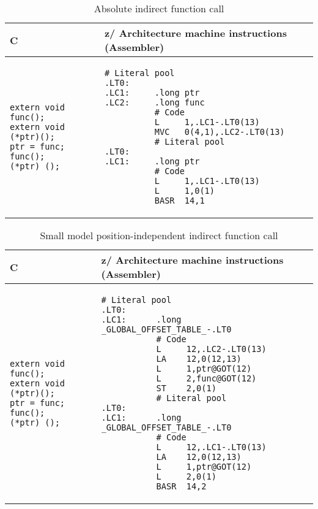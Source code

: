 \documentclass[english,11pt,twoside,toc=bib,toc=idx]{scrreprt}
\newcommand{\ARCH}{z/\kern-1pt Ar\-chi\-tec\-ture}
\newcommand{\ARCH}{ESA/390}
\newenvironment{DIFnomarkup}{}{} %
\begin{document}
\ifzseries\else
\begin{table}
  \centering
  \begin{DIFnomarkup}
  \begin{tabular}{p{}p{}}
    \toprule
    C & \ARCH{} machine instructions (Assembler) \\
    \midrule
\begin{lstlisting}[style=short]
extern void func();
extern void (*ptr)();
ptr = func;
func();
(*ptr) ();
\end{lstlisting}
    &
\begin{lstlisting}[style=short,language=simpleasm]
          # Literal pool
.LT0:
.LC1:     .long ptr
.LC2:     .long func
          # Code
          L     1,.LC1-.LT0(13)
          MVC   0(4,1),.LC2-.LT0(13)
          # Literal pool
.LT0:
.LC1:     .long ptr
          # Code
          L     1,.LC1-.LT0(13)
          L     1,0(1)
          BASR  14,1
\end{lstlisting} \\
  \end{tabular}
  \end{DIFnomarkup}
  \caption{Absolute indirect function call}
  \label{tab:fncallabsindirect}
\end{table}
\fi

\ifzseries\else
\begin{table}
  \centering
  \begin{DIFnomarkup}
  \begin{tabular}{p{}p{}}
    \toprule
    C & \ARCH{} machine instructions (Assembler) \\
    \midrule
\begin{lstlisting}[style=short]
extern void func();
extern void (*ptr)();
ptr = func;
func();
(*ptr) ();
\end{lstlisting}
    &
\begin{lstlisting}[style=short,language=simpleasm]
           # Literal pool
.LT0:
.LC1:      .long _GLOBAL_OFFSET_TABLE_-.LT0
           # Code
           L     12,.LC2-.LT0(13)
           LA    12,0(12,13)
           L     1,ptr@GOT(12)
           L     2,func@GOT(12)
           ST    2,0(1)
           # Literal pool
.LT0:
.LC1:      .long _GLOBAL_OFFSET_TABLE_-.LT0
           # Code
           L     12,.LC1-.LT0(13)
           LA    12,0(12,13)
           L     1,ptr@GOT(12)
           L     2,0(1)
           BASR  14,2
\end{lstlisting} \\
  \end{tabular}
  \end{DIFnomarkup}
  \caption{Small model position-independent indirect function call}
  \label{tab:fncallpicsmall}
\end{table}
\fi
\end{document}
